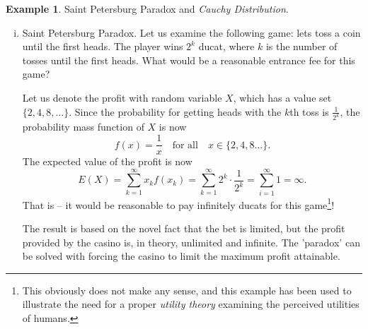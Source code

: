 \documentclass[12pt,a4paper,leqno]{report}
\theoremstyle{plain}
\theoremstyle{definition}
\newtheorem{esim}[equation]{Example}
\begin{document}
\begin{esim}
Saint Petersburg Paradox and \emph{Cauchy Distribution}.
\begin{enumerate}[(i)] 
\item Saint Petersburg Paradox. Let us examine the following game: lets toss a coin until the first heads. The player wins $2^k$ ducat, where $k$ is the number of tosses until the first heads. What would be a reasonable entrance fee for this game?

Let us denote the profit with random variable $X$, which has a value set $\{2,4,8, \dots \}$. Since the probability for getting heads with the $k$th toss is $\frac{1}{2^k}$, the probability mass function of $X$ is now
\[
f(x) = \frac{1}{x} \quad \text{for all} \quad x \in \{2,4,8 \dots\}.
\]
The expected value of the profit is now
\[
E(X) = \sum_{k=1}^\infty x_k f(x_k) =  \sum_{k=1}^\infty 2^k \cdot \frac{1}{2^k} = \sum_{i=1}^\infty 1 = \infty.
\]
That is -- it would be reasonable to pay infinitely ducats for this game\footnote{This obviously does not make any sense, and this example has been used to illustrate the need for a proper \emph{utility theory} examining the perceived utilities of humans.}!

The result is based on the novel fact that the bet is limited, but the profit provided by the casino is, in theory, unlimited and infinite. The 'paradox' can be solved with forcing the casino to limit the maximum  profit attainable.




\end{enumerate}
\end{esim}
\end{document}
